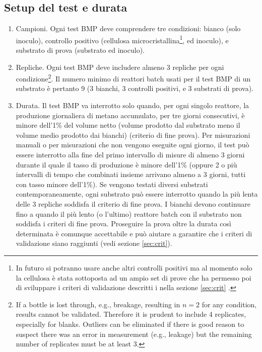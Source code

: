 \documentclass[]{article}
\begin{document}
\subsection{Setup del test e durata}
\label{sec:setup}
\begin{enumerate}
  \item Campioni. 
    Ogni test BMP deve comprendere tre condizioni: bianco (solo inoculo), controllo positivo (cellulosa microcristallina\footnote{
      In futuro si potranno usare anche altri controlli positivi \citep{kochEvaluationCommonSupermarket2020} ma al momento solo la cellulosa è stata sottoposta ad un ampio set di prove che ha permesso poi di sviluppare i criteri di validazione descritti i nella sezione \ref{sec:crit} \citep{hafnerImprovingInterlaboratoryReproducibility2020}.
    }, ed inoculo), e substrato di prova (substrato ed inoculo).
  \item Repliche. 
    Ogni test BMP deve includere almeno 3 repliche per ogni condizione\footnote{
      If a bottle is lost through, e.g., breakage, resulting in $n=2$ for any condition, results cannot be validated.
      Therefore it is prudent to include 4 replicates, especially for blanks.
      Outliers can be eliminated if there is good reason to suspect there was an error in measurement (e.g., leakage) but the remaining number of replicates must be at least 3.
    }.
    Il numero minimo di reattori batch usati per il test BMP di un substrato è pertanto 9 (3 bianchi, 3 controlli positivi, e 3 substrati di prova).
  \item Durata. 
    Il test BMP va interrotto solo quando, per ogni singolo reattore, la produzione giornaliera di metano accumulato, per tre giorni consecutivi, è minore dell’1\% del volume netto (volume prodotto dal substrato meno il volume medio prodotto dai bianchi) (criterio di fine prova). 
    Per misurazioni manuali o per misurazioni che non vengono eseguite ogni giorno, il test può essere interrotto alla fine del primo intervallo di misure di almeno 3 giorni durante il quale il tasso di produzione è minore dell’1\% (oppure 2 o più intervalli di tempo che combinati insieme arrivano almeno a 3 giorni, tutti con tasso minore dell’1\%). 
    Se vengono testati diversi substrati contemporaneamente, ogni substrato può essere interrotto quando la più lenta delle 3 repliche soddisfa il criterio di fine prova. 
    I bianchi devono continuare fino a quando il più lento (o l’ultimo) reattore batch con il substrato non soddisfa i criteri di fine prova. 
    Proseguire la prova oltre la durata così determinata è comunque accettabile e può aiutare a garantire che i criteri di validazione siano raggiunti (vedi sezione \ref{sec:crit}).
\end{enumerate}
\end{document}
